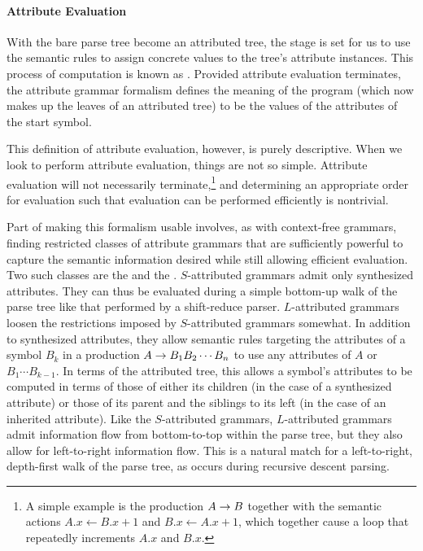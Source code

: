\paragraph{Attribute Evaluation}
With the bare parse tree become an attributed tree, the stage is set for us to use the semantic rules to assign concrete values to the tree's attribute instances. This process of computation is known as . Provided attribute evaluation terminates, the attribute grammar formalism defines the meaning of the program (which now makes up the leaves of an attributed tree) to be the values of the attributes of the start symbol.

This definition of attribute evaluation, however, is purely descriptive. When we look to perform attribute evaluation, things are not so simple. Attribute evaluation will not necessarily terminate,\footnote{A simple example is the production $A \rightarrow B$ together with the semantic actions $A.x \gets B.x + 1$ and $B.x \gets A.x + 1$, which together cause a loop that repeatedly increments $A.x$ and $B.x$.} and determining an appropriate order for evaluation such that evaluation can be performed efficiently is nontrivial.

Part of making this formalism usable involves, as with context-free grammars, finding restricted classes of attribute grammars that are sufficiently powerful to capture the semantic information desired while still allowing efficient evaluation. Two such classes are the  and the . $S$-attributed grammars admit only synthesized attributes. They can thus be evaluated during a simple bottom-up walk of the parse tree like that performed by a shift-reduce parser. $L$-attributed grammars loosen the restrictions imposed by $S$-attributed grammars somewhat. In addition to synthesized attributes, they allow semantic rules targeting the attributes of a symbol $B_k$ in a production $A \rightarrow B_1 B_2 \dotsm B_n$ to use any attributes of $A$ or $B_1 \dotsm B_{k-1}$. In terms of the attributed tree, this allows a symbol's attributes to be computed in terms of those of either its children (in the case of a synthesized attribute) or those of its parent and the siblings to its left (in the case of an inherited attribute). Like the $S$-attributed grammars, $L$-attributed grammars admit information flow from bottom-to-top within the parse tree, but they also allow for left-to-right information flow. This is a natural match for a left-to-right, depth-first walk of the parse tree, as occurs during recursive descent parsing.

